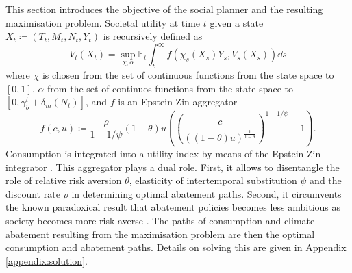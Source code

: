 \documentclass[../../main.tex]{subfiles}
\begin{document}
This section introduces the objective of the social planner and the resulting maximisation problem. Societal utility at time $t$ given a state $X_t \coloneqq (T_t, M_t, N_t, Y_t)$ is recursively defined as \begin{equation} \label{eq:social-objective}
    V_t(X_t) = \sup_{\chi, \alpha} \mathbb{E}_t 
    \int_{t}^{\infty} f(\chi_s(X_s) Y_s, V_s(X_s)) \dd{s}
\end{equation} where $\chi$ is chosen from the set of continuous functions from the state space to $[0, 1]$, $\alpha$ from the set of continuos functions from the state space to $[0, \gamma^t_b + \delta_m(N_t)]$, and $f$ is an Epstein-Zin aggregator \begin{equation} \label{eq:aggregator}
    f(c, u) \coloneqq \frac{\rho}{1 - 1 / \psi} (1 - \theta) u  \left( \left(\frac{c}{((1 - \theta) u)^{\frac{1}{1 - \theta}}}\right)^{1 - 1 / \psi} - 1 \right).
\end{equation} Consumption is integrated into a utility index by means of the Epstein-Zin integrator \citep{duffie_asset_1992}. This aggregator plays a dual role. First, it allows to disentangle the role of relative risk aversion $\theta$, elasticity of intertemporal substitution $\psi$ and the discount rate $\rho$ in determining optimal abatement paths. Second, it circumvents the known paradoxical result that abatement policies becomes less ambitious as society becomes more risk averse \citep{pindyck_economic_2013}. The paths of consumption and climate abatement resulting from the maximisation problem are then the optimal consumption and abatement paths. Details on solving this are given in Appendix \ref{appendix:solution}.

\end{document}
